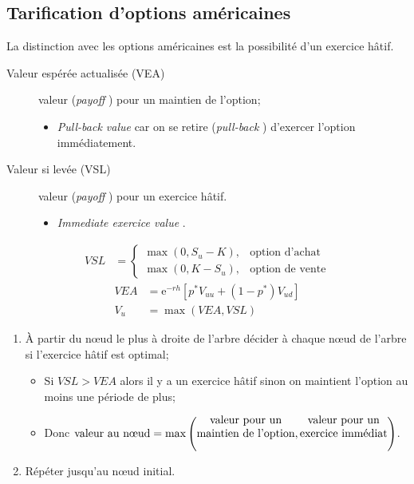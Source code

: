 \documentclass[10pt, french]{article}
\begin{document}
\begin{multicols*}{2}
\columnbreak
\subsection{Tarification d'options américaines}
La distinction avec les options américaines est la possibilité d'un exercice hâtif.

\begin{description}
	\item[Valeur espérée actualisée (VEA)]	valeur (\og \textit{payoff} \fg{}) pour un maintien de l'option;
		\begin{itemize}[leftmargin = *]
		\item	\og \textit{Pull-back value}\fg{} car on se retire (\og \textit{pull-back} \fg{}) d'exercer l'option immédiatement.
		\end{itemize}
	\item[Valeur si levée (VSL)]	valeur (\og \textit{payoff} \fg{}) pour un exercice hâtif.
		\begin{itemize}[leftmargin = *]
		\item	\og \textit{Immediate exercice value} \fg{}.
		\end{itemize}
\end{description}

\begin{distributions}
\begin{align*}
VSL	&=	
	\begin{cases}
	\max(0, S_{u} - K),	&	\text{option d'achat}	\\
	\max(0, K - S_{u}),	&	\text{option de vente}
	\end{cases}
\end{align*}
\begin{align*}
	VEA	
	&=		\textrm{e}^{-r h}\left[ p^{*}V_{uu} + (1 - p^{*})V_{ud} \right]	\\
	V_{u}	
	&=	\max(VEA, VSL)
\end{align*}
\end{distributions}

\begin{algo2}
\begin{enumerate}[leftmargin = *]
	\item	À partir du nœud le plus à droite de l'arbre décider à chaque nœud de l'arbre si l'exercice hâtif est optimal;
		\begin{itemize}[leftmargin = *]
		\item	Si $VSL > VEA$ alors il y a un exercice hâtif sinon on maintient l'option au moins une période de plus;
		\item	Donc $\text{valeur au nœud} = \max\left(\text{\shortstack{valeur pour un\\ maintien de l'option}}, \text{\shortstack{valeur pour un\\ exercice immédiat}}\right)$.
		\end{itemize}
	\item	Répéter jusqu'au nœud initial.
\end{enumerate}
\end{algo2}


\end{multicols*}
\end{document}
